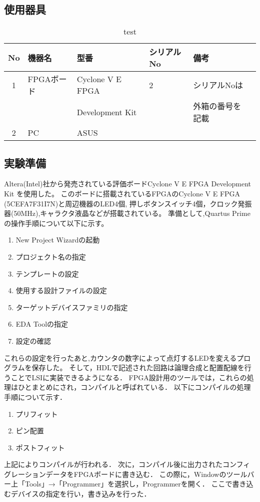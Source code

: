\documentclass{ltjsarticle}
\begin{document}
	\subsection{使用器具}
		\begin{table}[H]
		\centering
		\caption{test}
		\label{tab:used}
		\begin{tabular}{clllll} \toprule
		No&\multicolumn{1}{l}{機器名}&\multicolumn{1}{l}{型番}&\multicolumn{1}{l}{シリアルNo}&\multicolumn{1}{l}{備考}\\ \hline
		1&FPGAボード&Cyclone V E FPGA&2&シリアルNoは\\
		&&Development Kit&&外箱の番号を記載\\
		2&PC&ASUS &&\\
		\bottomrule
		\end{tabular}
		\end{table}
	\subsection{実験準備}
		Altera(Intel)社から発売されている評価ボードCyclone V E FPGA Development Kit を使用した。
		このボードに搭載されているFPGAのCyclone V E FPGA (5CEFA7F31I7N)と周辺機器のLED4個,
		押しボタンスイッチ4個，クロック発振器(50MHz),キャラクタ液晶などが搭載されている。
		準備として,Quartus Primeの操作手順について以下に示す。
		\begin{enumerate}
			\item New Project Wizardの起動
			\item プロジェクト名の指定
			\item テンプレートの設定
			\item 使用する設計ファイルの設定
			\item ターゲットデバイスファミリの指定
			\item EDA Toolの指定
			\item 設定の確認
		\end{enumerate}
		これらの設定を行ったあと,カウンタの数字によって点灯するLEDを変えるプログラムを保存した。
		そして，HDLで記述された回路は論理合成と配置配線を行うことでLSIに実装できるようになる．
		FPGA設計用のツールでは，これらの処理はひとまとめにされ，コンパイルと呼ばれている．
		以下にコンパイルの処理手順について示す．
		\begin{enumerate}
			\item プリフィット
			\item ピン配置
			\item ポストフィット
		\end{enumerate}
		上記によりコンパイルが行われる．
		次に，コンパイル後に出力されたコンフィグレーションデータをFPGAボードに書き込む．
		この際に，Windowのツールバー上「Tools」→「Programmer」を選択し，Programmerを開く．
		ここで書き込むデバイスの指定を行い，書き込みを行った．
\end{document}
